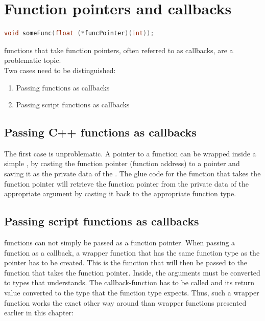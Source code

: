 \section{Function pointers and callbacks}

\SingleSpacing
\begin{lstlisting}[language=C++, caption=\myProperName{C++} function that takes a function pointer]
void someFunc(float (*funcPointer)(int));
\end{lstlisting}
\OnehalfSpacing

 functions that take function pointers, often referred to as callbacks, are a problematic topic.\\
Two cases need to be distinguished:
\begin{enumerate}
\item Passing  functions as callbacks
\item Passing script functions as callbacks
\end{enumerate}

\subsection{Passing C++ functions as callbacks}

The first case is unproblematic. A pointer to a  function can be wrapped inside a simple , by casting the function pointer (function address) to a  pointer and saving it as the private data of the . The glue code for the function that takes the function pointer will retrieve the function pointer from the private data of the appropriate argument by casting it back to the appropriate function type.

\subsection{Passing script functions as callbacks}

 functions can not simply be passed as a function pointer. When passing a  function as a callback, a wrapper function that has the same function type as the pointer has to be created. This is the  function that will then be passed to the function that takes the function pointer. Inside, the  arguments must be converted to types that  understands. The  callback-function has to be called and its return value converted to the  type that the function type expects. Thus, such a wrapper function works the exact other way around than wrapper functions presented earlier in this chapter:

